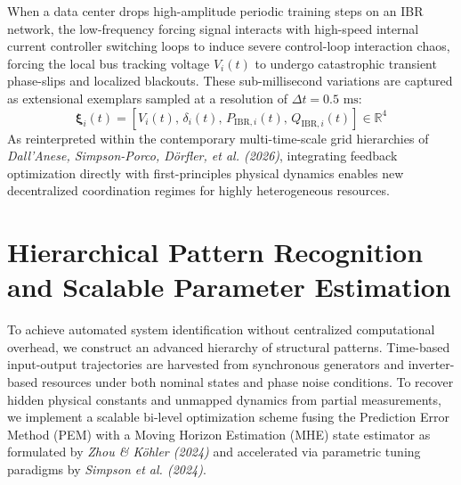 \documentclass[11pt,fleqn]{article}
\begin{document}
When a data center drops high-amplitude periodic training steps on an IBR network, the low-frequency forcing signal interacts with high-speed internal current controller switching loops to induce severe control-loop interaction chaos, forcing the local bus tracking voltage $V_i(t)$ to undergo catastrophic transient phase-slips and localized blackouts. These sub-millisecond variations are captured as extensional exemplars sampled at a resolution of $\Delta t = 0.5\text{ ms}$:
\begin{equation}
\bm{\xi}_i(t) = \left[ V_i(t), \, \delta_i(t), \, P_{\text{IBR}, i}(t), \, Q_{\text{IBR}, i}(t) \right] \in \mathbb{R}^4
\end{equation}
As reinterpreted within the contemporary multi-time-scale grid hierarchies of \textit{Dall'Anese, Simpson-Porco, Dörfler, et al. (2026)}, integrating feedback optimization directly with first-principles physical dynamics enables new decentralized coordination regimes for highly heterogeneous resources.

\section{Hierarchical Pattern Recognition and Scalable Parameter Estimation}
To achieve automated system identification without centralized computational overhead, we construct an advanced hierarchy of structural patterns. Time-based input-output trajectories are harvested from synchronous generators and inverter-based resources under both nominal states and phase noise conditions. To recover hidden physical constants and unmapped dynamics from partial measurements, we implement a scalable bi-level optimization scheme fusing the Prediction Error Method (PEM) with a Moving Horizon Estimation (MHE) state estimator as formulated by \textit{Zhou \& Köhler (2024)} and accelerated via parametric tuning paradigms by \textit{Simpson et al. (2024)}.
\end{document}
